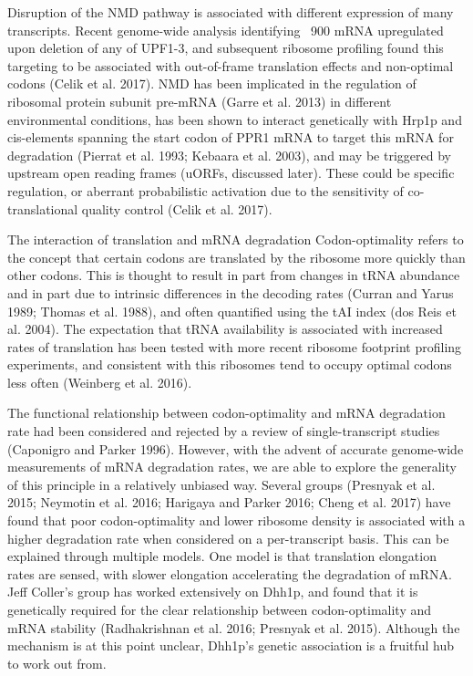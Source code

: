 Disruption of the NMD pathway is associated
with different expression of many transcripts. Recent genome-wide
analysis identifying ~900 mRNA upregulated upon deletion of any of
UPF1-3, and subsequent ribosome profiling found this targeting to be
associated with out-of-frame translation effects and non-optimal
codons (Celik et al. 2017). NMD has been implicated in the regulation
of ribosomal protein subunit pre-mRNA (Garre et al. 2013) in different
environmental conditions, has been shown to interact genetically with
Hrp1p and cis-elements spanning the start codon of PPR1 mRNA to target
this mRNA for degradation (Pierrat et al. 1993; Kebaara et al. 2003),
and may be triggered by upstream open reading frames (uORFs, discussed
later). These could be specific regulation, or aberrant probabilistic
activation due to the sensitivity of co-translational quality control
(Celik et al. 2017).  


The interaction of translation and mRNA
degradation Codon-optimality refers to the concept that certain codons
are translated by the ribosome more quickly than other codons. This is
thought to result in part from changes in tRNA abundance and in part
due to intrinsic differences in the decoding rates (Curran and Yarus
1989; Thomas et al. 1988), and often quantified using the tAI index
(dos Reis et al. 2004). The expectation that tRNA availability is
associated with increased rates of translation has been tested with
more recent ribosome footprint profiling experiments, and consistent
with this ribosomes tend to occupy optimal codons less often (Weinberg
et al. 2016).  

The functional relationship between codon-optimality
and mRNA degradation rate had been considered and rejected by a review
of single-transcript studies (Caponigro and Parker 1996). However,
with the advent of accurate genome-wide measurements of mRNA
degradation rates, we are able to explore the generality of this
principle in a relatively unbiased way. Several groups (Presnyak et
al. 2015; Neymotin et al. 2016; Harigaya and Parker 2016; Cheng et al.
2017) have found that poor codon-optimality and lower ribosome density
is associated with a higher degradation rate when considered on a
per-transcript basis. This can be explained through multiple models.
One model is that translation elongation rates are sensed, with slower
elongation accelerating the degradation of mRNA. Jeff Coller’s group
has worked extensively on Dhh1p, and found that it is genetically
required for the clear relationship between codon-optimality and mRNA
stability (Radhakrishnan et al. 2016; Presnyak et al. 2015). Although
the mechanism is at this point unclear, Dhh1p’s genetic association is
a fruitful hub to work out from.  

